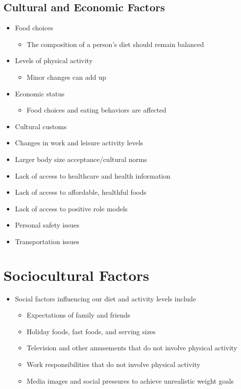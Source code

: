 \documentclass[title={Chapter 10: Achieving and Maintaining a Healthful Body Weight}]{fdsn201notes}
\begin{document}
\subsection{Cultural and Economic Factors}\label{subsec:cultural-and-economic-factors}
\begin{itemize}
	\item Food choices
	\begin{itemize}
		\item The composition of a person’s diet should remain balanced
	\end{itemize}
	\item Levels of physical activity
	\begin{itemize}
		\item Minor changes can add up
	\end{itemize}
	\item Economic status
	\begin{itemize}
		\item Food choices and eating behaviors are affected
	\end{itemize}
	\item Cultural customs
	\item Changes in work and leisure activity levels
	\item Larger body size acceptance/cultural norms
	\item Lack of access to healthcare and health information
	\item Lack of access to affordable, healthful foods
	\item Lack of access to positive role models
	\item Personal safety issues
	\item Transportation issues
\end{itemize}

\section{Sociocultural Factors}\label{sec:sociocultural-factors}
\begin{itemize}
	\item Social factors influencing our diet and activity levels include
	\begin{itemize}
		\item Expectations of family and friends
		\item Holiday foods, fast foods, and serving sizes
		\item Television and other amusements that do not involve physical activity
		\item Work responsibilities that do not involve physical activity
		\item Media images and social pressures to achieve unrealistic weight goals
	\end{itemize}
\end{itemize}
\end{document}

